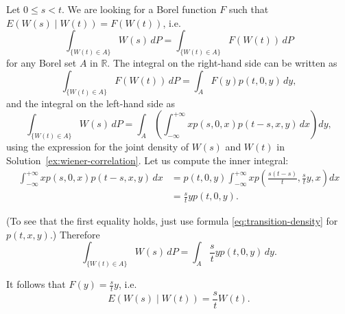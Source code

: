 \begin{Solution}
Let $0 \leq s < t$. We are looking for a Borel function $F$ such that $E(W(s) \mid W(t)) = F(W(t))$, i.e.
\[
\int_{\{W(t) \in A\}} W(s) \, dP = \int_{\{W(t) \in A\}} F(W(t)) \, dP
\]
for any Borel set $A$ in $\mathbb{R}$. The integral on the right-hand side can be written as
\[
\int_{\{W(t) \in A\}} F(W(t)) \, dP = \int_A F(y) p(t, 0, y) \, dy,
\]
and the integral on the left-hand side as
\[
\int_{\{W(t) \in A\}} W(s) \, dP = \int_A \left(\int_{-\infty}^{+\infty} x p(s, 0, x) p(t - s, x, y) \, dx\right) dy,
\]
using the expression for the joint density of $W(s)$ and $W(t)$ in Solution~\ref{ex:wiener-correlation}. Let us compute the inner integral:
\begin{equation}
\begin{aligned}
\int_{-\infty}^{+\infty} x p(s, 0, x) p(t - s, x, y) \, dx &= p(t, 0, y) \int_{-\infty}^{+\infty} x p\left(\frac{s(t-s)}{t}, \frac{s}{t} y, x\right) dx \\
&= \frac{s}{t} y p(t, 0, y).
\end{aligned}
\end{equation}

(To see that the first equality holds, just use formula \cref{eq:transition-density} for $p(t, x, y)$.) Therefore
\[
\int_{\{W(t) \in A\}} W(s) \, dP = \int_A \frac{s}{t} y p(t, 0, y) \, dy.
\]

It follows that $F(y) = \frac{s}{t} y$, i.e.
\[
E(W(s) \mid W(t)) = \frac{s}{t} W(t).
\]
\end{Solution}
